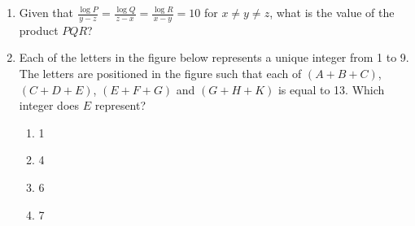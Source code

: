 \documentclass[journal]{IEEEtran}
\begin{document}
\begin{enumerate}
{        }
    \item{
            Given that \( \frac{\log P}{y-z} = \frac{\log Q}{z-x} = \frac{\log R}{x-y} = 10 \) for \( x \ne y \ne z \), what is the value of the product \( PQR \)?
            \begin{enumerate}
            	\begin{multicols}{4}
            		\item (A) 0
            		\item (B) 1
            		\item (C) $xyz$
            		\item (D) $10^{xyz}$
            	\end{multicols}
            \end{enumerate}
        }
    \item{
        
           	Each of the letters in the figure below represents a unique integer from 1 to 9. The letters are positioned in the figure such that each of \((A+B+C)\), \((C+D+E)\), \((E+F+G)\) and \((G+H+K)\) is equal to 13. Which integer does \(E\) represent?
           	\begin{center}
           	\end{center}
           	\begin{multicols}{4}
           		
				\begin{enumerate}
					\item 1
					\item 4
					\item 6
					\item 7
				\end{enumerate}
			\end{multicols}

        
        }
   
    \end{enumerate}
\end{document}

